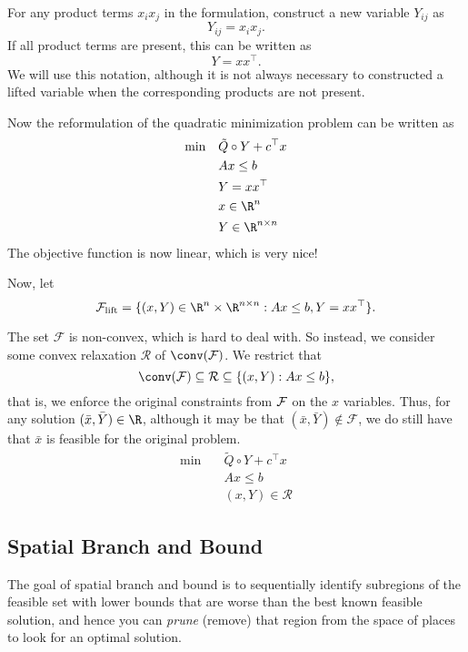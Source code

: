 For any product terms $x_ix_j$ in the formulation, construct a new variable $Y_{ij}$ as
\begin{equation}
Y_{ij} = x_ix_j.
\end{equation}
If all product terms are present, this can be written as
\begin{equation}
Y = x x^\top.
\end{equation}
We will use this notation, although it is not always necessary to constructed a lifted variable when the corresponding products are not present.

Now the reformulation of the quadratic minimization problem can be written as 
\begin{align}
\label{lifted-problem}
\min\quad  &\tilde Q \circ Y + c^\top x\\
&Ax \leq b\\
& Y = x x^\top\\
&x \in \R^n\\
& Y \in \R^{n \times n}
\end{align}
The objective function is now linear, which is very nice!


Now, let
$$
\mathcal F_\lift = \{ (x,Y) \in \R^n \times \R^{n \times n}: Ax \leq b, Y = x x^\top\}.
$$

The set $\mathcal F$ is non-convex, which is hard to deal with.  So instead, we consider some convex relaxation $\mathcal R$ of $\conv(\mathcal F)$.  We restrict that 
$$
\conv(\mathcal F) \subseteq \mathcal R \subseteq \{ (x,Y) : Ax \leq b \},
$$
that is, we enforce the original constraints from ${\mathcal F}$ on the $x$ variables.  Thus, for any solution $(\bar x,\bar Y) \in \R$, although it may be that $(\bar x, \bar Y) \notin \mathcal F$, we do still have that $\bar x$ is feasible for the original problem.
\begin{align}
\label{relaxed-lifted-problem}
\min\quad  &\tilde Q \circ Y + c^\top x\\
&Ax \leq b\\
& (x,Y) \in \mathcal R
\end{align}

\subsection{Spatial Branch and Bound}
The goal of spatial branch and bound is to sequentially identify subregions of the feasible set with lower bounds that are worse than the best known feasible solution, and hence you can \emph{prune} (remove) that region from the space of 
places to look for an optimal solution.


